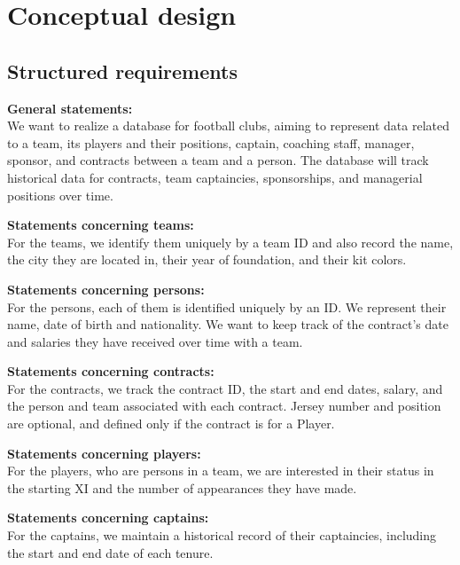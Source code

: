 
\section{Conceptual design}\label{sec:conceptual-design}

\subsection{Structured requirements}\label{subsec:structured-requirements}

\setlength{\parindent}{0cm}
\vspace{12px}
\textbf{General statements:\\}
We want to realize a database for football clubs, aiming to represent data related to a team, its players and their positions, captain, coaching staff, manager, sponsor, and contracts between a team and a person. The database will track historical data for contracts, team captaincies, sponsorships, and managerial positions over time.

\vspace{12px}
\textbf{Statements concerning teams:\\}
For the teams, we identify them uniquely by a team ID and also record the name, the city they are located in, their year of foundation, and their kit colors.

\vspace{12px}
\textbf{Statements concerning persons:\\}
 For the persons, each of them is identified uniquely by an ID. We represent their name, date of birth and nationality. We want to keep track of the contract’s date and salaries they have received over time with a team.

 \vspace{12px}
\textbf{Statements concerning contracts:\\}
For the contracts, we track the contract ID, the start and end dates, salary, and the person and team associated with each contract. Jersey number and position are optional, and defined only if the contract is for a Player.

\vspace{12px}
\textbf{Statements concerning players:\\}
For the players, who are persons in a team, we are interested in their status in the starting XI and the number of appearances they have made.

\vspace{12px}
\textbf{Statements concerning captains:\\}
For the captains, we maintain a historical record of their captaincies, including the start and end date of each tenure.

